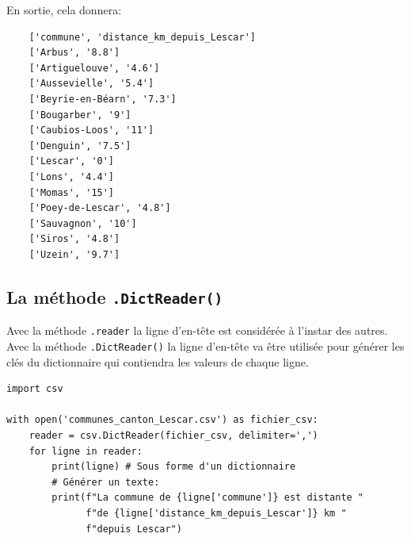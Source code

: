 \documentclass[a4paper,12pt]{book}
\begin{document}
En sortie, cela donnera:
\begin{verbatim}
    ['commune', 'distance_km_depuis_Lescar']
    ['Arbus', '8.8']
    ['Artiguelouve', '4.6']
    ['Aussevielle', '5.4']
    ['Beyrie-en-Béarn', '7.3']
    ['Bougarber', '9']
    ['Caubios-Loos', '11']
    ['Denguin', '7.5']
    ['Lescar', '0']
    ['Lons', '4.4']
    ['Momas', '15']
    ['Poey-de-Lescar', '4.8']
    ['Sauvagnon', '10']
    ['Siros', '4.8']
    ['Uzein', '9.7']
\end{verbatim}
\medskip

\subsection*{La méthode \texttt{.DictReader()}}
Avec la méthode \texttt{.reader} la ligne d'en-tête est considérée à l'instar des autres. Avec la méthode \texttt{.DictReader()} la ligne d'en-tête va être utilisée pour générer les clés du dictionnaire qui contiendra les valeurs de chaque ligne.
\medskip

\begin{lstlisting}[caption=La méthode \texttt{.DictReader()}]
import csv

with open('communes_canton_Lescar.csv') as fichier_csv:
    reader = csv.DictReader(fichier_csv, delimiter=',')
    for ligne in reader:
        print(ligne) # Sous forme d'un dictionnaire
        # Générer un texte:
        print(f"La commune de {ligne['commune']} est distante "
              f"de {ligne['distance_km_depuis_Lescar']} km "
              f"depuis Lescar")
\end{lstlisting}
\medskip
\end{document}

